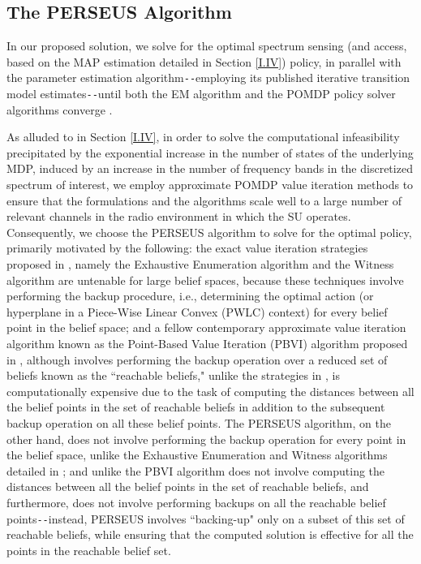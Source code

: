 \documentclass[12pt, draftcls, onecolumn]{IEEEtran}
\begin{document}
\subsection{The PERSEUS Algorithm}\label{II.II}
In our proposed solution, we solve for the optimal spectrum sensing (and access, based on the MAP estimation detailed in Section \ref{I.IV}) policy, in parallel with the parameter estimation algorithm\texttt{-{}-}employing its published iterative transition model estimates\texttt{-{}-}until both the EM algorithm and the POMDP policy solver algorithms converge \cite{WCL:paper}.

As alluded to in Section \ref{I.IV}, in order to solve the computational infeasibility precipitated by the exponential increase in the number of states of the underlying MDP, induced by an increase in the number of frequency bands in the discretized spectrum of interest, we employ approximate POMDP value iteration methods to ensure that the formulations and the algorithms scale well to a large number of relevant channels in the radio environment in which the SU operates. Consequently, we choose the PERSEUS algorithm \cite{WCL:13} to solve for the optimal policy, primarily motivated by the following: the exact value iteration strategies proposed in \cite{PUOccupancy:18}, namely the Exhaustive Enumeration algorithm and the Witness algorithm are untenable for large belief spaces, because these techniques involve performing the backup procedure, i.e., determining the optimal action (or hyperplane in a Piece-Wise Linear Convex (PWLC) context) for every belief point in the belief space; and a fellow contemporary approximate value iteration algorithm known as the Point-Based Value Iteration (PBVI) algorithm proposed in \cite{PUOccupancy:17}, although involves performing the backup operation over a reduced set of beliefs known as the ``reachable beliefs," unlike the strategies in \cite{PUOccupancy:17}, is computationally expensive due to the task of computing the distances between all the belief points in the set of reachable beliefs in addition to the subsequent backup operation on all these belief points. The PERSEUS algorithm, on the other hand, does not involve performing the backup operation for every point in the belief space, unlike the Exhaustive Enumeration and Witness algorithms detailed in \cite{PUOccupancy:18}; and unlike the PBVI algorithm \cite{PUOccupancy:17} does not involve computing the distances between all the belief points in the set of reachable beliefs, and furthermore, does not involve performing backups on all the reachable belief points\texttt{-{}-}instead, PERSEUS involves ``backing-up" only on a subset of this set of reachable beliefs, while ensuring that the computed solution is effective for all the points in the reachable belief set.
\end{document}
